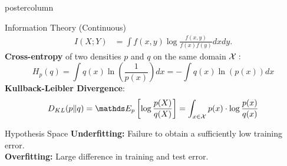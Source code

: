 \documentclass{beamer}
\begin{document}
\begin{frame}[fragile]{}
\begin{columns}
\begin{column}{.31\textwidth}
\begin{beamercolorbox}[center]{postercolumn}
\begin{minipage}{.98\textwidth}
{\begin{myblock}{Information Theory (Continuous)}
\begin{equation*}
\begin{aligned}
										I(X ; Y) &= \int f(x,y) \log \frac{f(x,y)}{f(x)f(y)} dx dy.
									\end{aligned}
								\end{equation*}
								\textbf{Cross-entropy} of two densities $p$ and $q$ on the same domain $\mathcal{X}:$
								$$ H_p(q) = \int q(x) \ln\left(\frac{1}{p(x)}\right) dx = - \int q(x) \ln\left(p(x)\right) dx $$
								\textbf{Kullback-Leibler Divergence}:
								$$ D_{KL}(p \| q) = \E_p \left[\log \frac{p(X)}{q(X)}\right] = \int_{x \in \Xspace} p(x) \cdot \log \frac{p(x)}{q(x)} $$
							\end{myblock}
							\begin{myblock}{Hypothesis Space}
								\textbf{Underfitting:} Failure to obtain a sufficiently low training error. \\
								\textbf{Overfitting:} Large difference in training and test error.\\
								

\end{myblock}}
\end{minipage}
\end{beamercolorbox}
\end{column}
\end{columns}
\end{frame}
\end{document}
